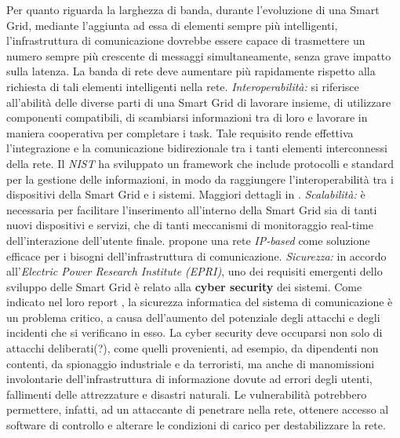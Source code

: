 Per quanto riguarda la larghezza di banda, durante l'evoluzione di una Smart Grid, mediante l'aggiunta ad essa di elementi sempre più intelligenti, l'infrastruttura di comunicazione dovrebbe essere capace di trasmettere un numero sempre più crescente di messaggi simultaneamente, senza grave impatto sulla latenza. La banda di rete deve aumentare più rapidamente rispetto alla richiesta di tali elementi intelligenti nella rete.
\newline \newline
\textit{Interoperabilità:} si riferisce all'abilità delle diverse parti di una Smart Grid di lavorare insieme, di utilizzare componenti compatibili, di scambiarsi informazioni tra di loro e lavorare in maniera cooperativa per completare i task. Tale requisito rende effettiva l'integrazione e la comunicazione bidirezionale tra i tanti elementi interconnessi della rete.\newline
Il \emph{NIST} ha sviluppato un framework che include protocolli e standard per la gestione delle informazioni, in modo da raggiungere l'interoperabilità tra i dispositivi della Smart Grid e i sistemi. Maggiori dettagli in \cite{surveymotiv}.
\newline \newline
\textit{Scalabilità:} è necessaria per facilitare l'inserimento all'interno della Smart Grid sia di tanti nuovi dispositivi e servizi, che di tanti meccanismi di monitoraggio real-time dell'interazione dell'utente finale. \newline
\cite{surveymotiv} propone una rete \emph{IP-based} come soluzione efficace per i bisogni dell'infrastruttura di comunicazione.
\newline \newline
\textit{Sicurezza:} in accordo all'\emph{Electric Power Research Institute (EPRI)}, uno dei requisiti emergenti dello sviluppo delle Smart Grid è relato alla \textbf{cyber security} dei sistemi. Come indicato nel loro report \cite{surveymotiv}, la sicurezza informatica del sistema di comunicazione è un problema critico, a causa dell'aumento del potenziale degli attacchi e degli incidenti che si verificano in esso. \newline 
La cyber security deve occuparsi non solo di attacchi deliberati(?), come quelli provenienti, ad esempio, da dipendenti non contenti, da spionaggio industriale e da terroristi, ma anche di manomissioni involontarie dell'infrastruttura di informazione dovute ad errori degli utenti, fallimenti delle attrezzature e disastri naturali. Le vulnerabilità potrebbero permettere, infatti, ad un attaccante di penetrare nella rete, ottenere accesso al software di controllo e alterare le condizioni di carico per destabilizzare la rete. \newline

